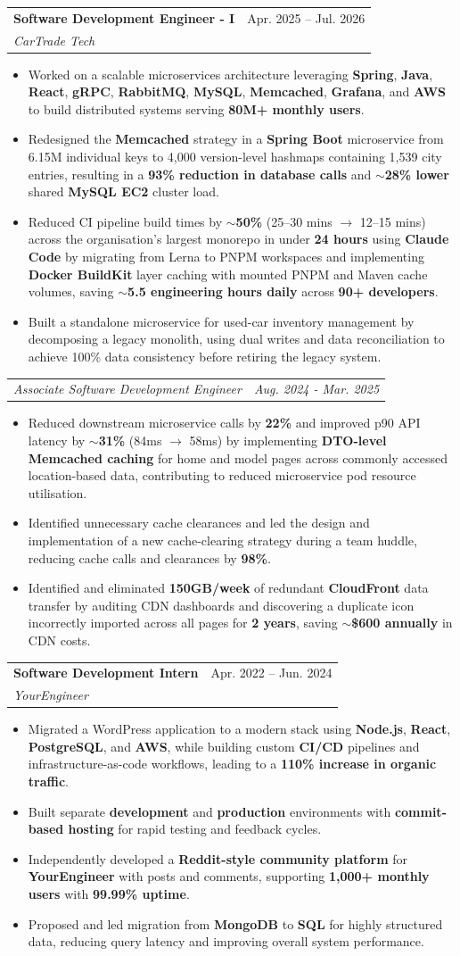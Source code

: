 \documentclass[letterpaper,11pt]{article}
\makeatletter
\newcommand{\resumeItem}[1]{
  \item\small{
    {#1 \vspace{-2pt}}
  }
}
\newcommand{\resumeSubheading}[4]{
  \vspace{-2pt}\item
    \begin{tabular*}{0.97\textwidth}[t]{l@{\extracolsep{\fill}}r}
      \textbf{#1} & #2 \\
      \textit{\small#3} & \textit{\small #4} \\
    \end{tabular*}\vspace{-7pt}
}
\newcommand{\resumeSubSubheading}[2]{
    \item
    \begin{tabular*}{0.97\textwidth}{l@{\extracolsep{\fill}}r}
      \textit{\small#1} & \textit{\small #2} \\
    \end{tabular*}\vspace{-7pt}
}
\newcommand{\resumeItemListStart}{\begin{itemize}}
\newcommand{\resumeItemListEnd}{\end{itemize}\vspace{-5pt}}
\makeatother
\begin{document}
\resumeSubheading
{Software Development Engineer - I}{Apr. 2025 -- Jul. 2026}
{CarTrade Tech}{ }
\resumeItemListStart
\resumeItem{Worked on a scalable microservices architecture leveraging \textbf{Spring}, \textbf{Java}, \textbf{React}, \textbf{gRPC}, \textbf{RabbitMQ}, \textbf{MySQL}, \textbf{Memcached}, \textbf{Grafana}, and \textbf{AWS} to build distributed systems serving \textbf{80M+ monthly users}.}
\resumeItem{Redesigned the \textbf{Memcached} strategy in a \textbf{Spring Boot} microservice from 6.15M individual keys to 4,000 version-level hashmaps containing 1,539 city entries, resulting in a \textbf{93\% reduction in database calls} and \textbf{$\sim$28\% lower} shared \textbf{MySQL EC2} cluster load.}
\resumeItem{Reduced CI pipeline build times by \textbf{$\sim$50\%} (25--30 mins $\rightarrow$ 12--15 mins) across the organisation's largest monorepo in under \textbf{24 hours} using \textbf{Claude Code} by migrating from Lerna to PNPM workspaces and implementing \textbf{Docker BuildKit} layer caching with mounted PNPM and Maven cache volumes, saving \textbf{$\sim$5.5 engineering hours daily} across \textbf{90+ developers}.}
\resumeItem{Built a standalone microservice for used-car inventory management by decomposing a legacy monolith, using dual writes and data reconciliation to achieve 100\% data consistency before retiring the legacy system.}
\resumeItemListEnd
\resumeSubSubheading
{Associate Software Development Engineer}{Aug. 2024 - Mar. 2025}
\resumeItemListStart
\resumeItem{Reduced downstream microservice calls by \textbf{22\%} and improved p90 API latency by \textbf{$\sim$31\%} (84ms $\rightarrow$ 58ms) by implementing \textbf{DTO-level Memcached caching} for home and model pages across commonly accessed location-based data, contributing to reduced microservice pod resource utilisation.}
\resumeItem{Identified unnecessary cache clearances and led the design and implementation of a new cache-clearing strategy during a team huddle, reducing cache calls and clearances by \textbf{98\%}.}
\resumeItem{Identified and eliminated \textbf{150GB/week} of redundant \textbf{CloudFront} data transfer by auditing CDN dashboards and discovering a duplicate icon incorrectly imported across all pages for \textbf{2 years}, saving \textbf{$\sim$\$600 annually} in CDN costs.}
\resumeItemListEnd

\resumeSubheading
{Software Development Intern}{Apr. 2022 -- Jun. 2024}
{YourEngineer}{ }
\resumeItemListStart
\resumeItem{Migrated a WordPress application to a modern stack using \textbf{Node.js}, \textbf{React}, \textbf{PostgreSQL}, and \textbf{AWS}, while building custom \textbf{CI/CD} pipelines and infrastructure-as-code workflows, leading to a \textbf{110\% increase in organic traffic}.}
\resumeItem{Built separate \textbf{development} and \textbf{production} environments with \textbf{commit-based hosting} for rapid testing and feedback cycles.}
\resumeItem{Independently developed a \textbf{Reddit-style community platform} for \textbf{YourEngineer} with posts and comments, supporting \textbf{1,000+ monthly users} with \textbf{99.99\% uptime}.}
\resumeItem{Proposed and led migration from \textbf{MongoDB} to \textbf{SQL} for highly structured data, reducing query latency and improving overall system performance.}
\resumeItemListEnd
\end{document}
